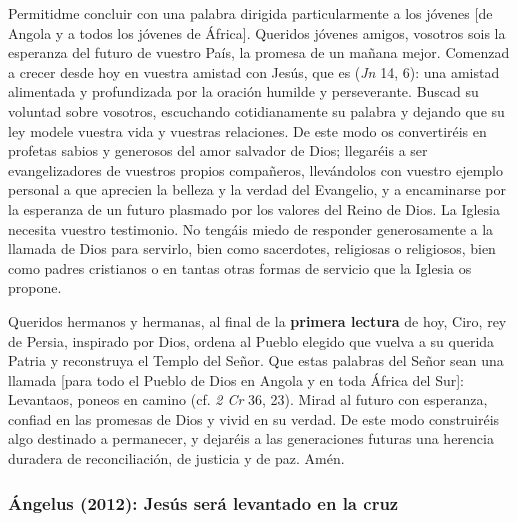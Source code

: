 \begin{body}
Permitidme concluir con una palabra dirigida particularmente a los jóvenes [de Angola y a todos los jóvenes de África]. Queridos jóvenes amigos, vosotros sois la esperanza del futuro de vuestro País, la promesa de un mañana mejor. Comenzad a crecer desde hoy en vuestra amistad con Jesús, que es  (\textit{Jn} 14, 6): una amistad alimentada y profundizada por la oración humilde y perseverante. Buscad su voluntad sobre vosotros, escuchando cotidianamente su palabra y dejando que su ley modele vuestra vida y vuestras relaciones. De este modo os convertiréis en profetas sabios y generosos del amor salvador de Dios; llegaréis a ser evangelizadores de vuestros propios compañeros, llevándolos con vuestro ejemplo personal a que aprecien la belleza y la verdad del Evangelio, y a encaminarse por la esperanza de un futuro plasmado por los valores del Reino de Dios. La Iglesia necesita vuestro testimonio. No tengáis miedo de responder generosamente a la llamada de Dios para servirlo, bien como sacerdotes, religiosas o religiosos, bien como padres cristianos o en tantas otras formas de servicio que la Iglesia os propone.

Queridos hermanos y hermanas, al final de la \textbf{primera lectura} de hoy, Ciro, rey de Persia, inspirado por Dios, ordena al Pueblo elegido que vuelva a su querida Patria y reconstruya el Templo del Señor. Que estas palabras del Señor sean una llamada [para todo el Pueblo de Dios en Angola y en toda África del Sur]: Levantaos, poneos en camino (cf. \textit{2 Cr} 36, 23). Mirad al futuro con esperanza, confiad en las promesas de Dios y vivid en su verdad. De este modo construiréis algo destinado a permanecer, y dejaréis a las generaciones futuras una herencia duradera de reconciliación, de justicia y de paz. Amén.
\end{body}

\label{b2-03-04-2012A}
\newpage

\subsubsection{Ángelus (2012): Jesús será levantado en la cruz}


